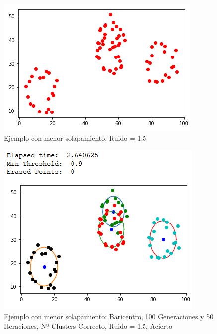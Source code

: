 \documentclass[conference,a4paper]{IEEEtran}
\begin{document}
\begin{figure}[H]
\centering
\includegraphics[scale=0.8]{Experimentacion/EjemploMenorSolapamiento/EjemploMenorSolapamientoMaxRuido}
\caption{Ejemplo con menor solapamiento, Ruido = 1.5}
\end{figure}

\begin{figure}[H]
\centering
\includegraphics[scale=0.65]{Experimentacion/EjemploMenorSolapamiento/ejms_b_100_50_mr_correct}
\caption{Ejemplo con menor solapamiento: Baricentro, 100 Generaciones y 50 Iteraciones,  Nº Clusters Correcto, Ruido = 1.5, Acierto\\}
\end{figure}
\end{document}
